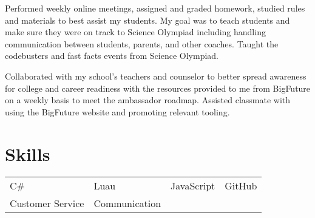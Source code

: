 \documentclass{my_cv}
\begin{document}
Performed weekly online meetings, assigned and graded homework, studied rules and materials to best assist my students. My goal was to teach students and make sure they were on track to Science Olympiad including handling communication between students, parents, and other coaches. Taught the codebusters and fast facts events from Science Olympiad.

Collaborated with my school's teachers and counselor to better spread awareness for college and career readiness with the resources provided to me from BigFuture on a weekly basis to meet the ambassador roadmap. Assisted classmate with using the BigFuture website and promoting relevant tooling.

\section{Skills}
\begin{tabular}{l l l l}
C\# & Luau & JavaScript & GitHub \\
Customer Service & Communication
\end{tabular}
\end{document}
